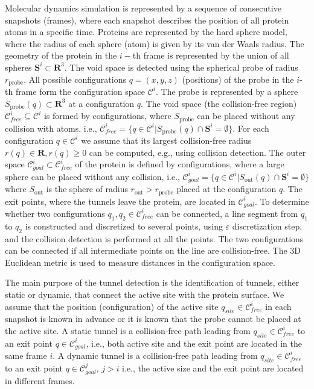 \documentclass[usletter, 10pt, conference]{svjour3}      %
\def\qinit{q_{site}}
\def\CG{\mathcal{C}_{goal}}
\def\C{\mathcal{C}}
\def\CF{\mathcal{C}_{free}}
\def\probe{r_{\mathrm{probe}}}
\def\Sprobe{S_{\mathrm{probe}}}
\def\gprobe{r_{\mathrm{out}}}
\def\Sgprobe{S_{\mathrm{out}}}
\def\R{\mathbf{R}}
\def\SS{\mathbf{S}}
\begin{document}
Molecular dynamics simulation is represented by a sequence of consecutive snapshots (frames), where each snapshot describes the position of all protein atoms in a specific time.
Proteins are represented by the hard sphere model, where the radius of each sphere (atom) is given by its van der Waals radius.
The geometry of the protein in the $i-$th frame is represented by the union of all spheres $\SS^i \subset \R^3$.
The void space is detected using the spherical probe of radius $\probe$. 
All possible configurations $q=(x,y,z)$ (positions) of the probe in the $i$-th frame form the configuration space $\C^i$.
The probe is represented by a sphere $\Sprobe(q) \subset \R^3$ at a configuration $q$.
The void space (the collision-free region) $\CF^i \subseteq \C^i$ is formed by configurations, where $\Sprobe$ can be placed without any collision with atoms, i.e.,  $\CF^i = \{q \in \C^i | \Sprobe(q) \cap \SS^i = \emptyset\}$.
For each configuration $q\in\C^i$ we assume that its largest collision-free radius $r(q) \in \mathbf{R}, r(q)\ge 0$ can be computed, e.g., 
using collision detection.
The outer space  $\CG^i \subset \CF^i$ of the protein is defined by configurations, where a large sphere can be placed without any collision,
i.e., $\CG^i=\{q\in \C^i| \Sgprobe(q) \cap \SS^i = \emptyset \}$ where $\Sgprobe$ is the sphere of radius $\gprobe > \probe$ 
placed at the configuration $q$.
The exit points, where the tunnels leave the protein, are located in $\CG^i$.
To determine whether two configurations $q_1, q_2 \in \CF^i$ can be connected, a line segment from $q_1$ to $q_2$ is constructed
and discretized to several points, using $\varepsilon$ discretization step, and the collision detection is performed at all the points.
The two configurations can be connected if all intermediate points on the line are collision-free. 
The 3D Euclidean metric is used to measure distances in the configuration space.

The main purpose of the tunnel detection is the identification of tunnels, either static or dynamic, that connect the active site with the protein surface.
We assume that the position (configuration) of the active site $\qinit \in \CF^i$ in each snapshot is known in advance 
or it is known that the probe cannot be placed at the active site.
A static tunnel is a collision-free path leading from $\qinit \in \CF^i$ to an exit point $q \in \CG^i$, i.e., both active site
and the exit point are located in the same frame $i$.
A dynamic tunnel is a collision-free path leading from $\qinit \in \CF^i$ to an exit point $q \in \CG^j$, $j>i$ i.e., the active size and the
 exit point are located in different frames.
\end{document}
